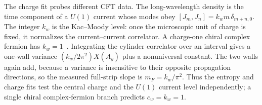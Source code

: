 \documentclass[aps,prb,twocolumn,superscriptaddress,longbibliography,floatfix]{revtex4-2}
\theoremstyle{plain}
\theoremstyle{definition}
\theoremstyle{remark}
\begin{document}
The charge fit probes different CFT data.  The long-wavelength density is
the time component of a $U(1)$ current whose modes obey
$[J_m,J_n]=k_w m\,\delta_{m+n,0}$.  The integer $k_w$ is the Kac--Moody
level: once the microscopic unit of charge is fixed, it normalizes the
current--current correlator.  A charge-one chiral complex fermion has
$k_w=1$~\cite{DiFrancescoMathieuSenechal1997}.  Integrating the cylinder
correlator over an interval gives a one-wall variance
$(k_w/2\pi^2)X(A_y)$ plus a nonuniversal constant.  The two walls again add,
because a variance is insensitive to their opposite propagation directions,
so the measured full-strip slope is $m_F=k_w/\pi^2$.  Thus the entropy and
charge fits test the central charge and the $U(1)$ current level
independently; a single chiral complex-fermion branch predicts
$c_w=k_w=1$.
\end{document}
